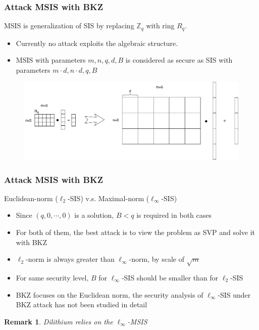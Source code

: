 \documentclass{beamer}
\newcommand{\bbZ}{\mathbb{Z}}
\newtheorem*{remark}{Remark}
\begin{document}
\frame
{
  \frametitle{Attack MSIS with BKZ}

  MSIS is generalization of SIS by replacing $\bbZ_q$ with ring $R_q$.
  \begin{itemize}
  	\item Currently no attack exploits the algebraic structure.
  	\item MSIS with parameters $m,n,q,d,B$ is considered as secure as SIS with parameters $m\cdot d,n\cdot d,q,B$
  \end{itemize}
  \begin{figure}[ht!]
  \includegraphics[width=\textwidth]{files/MSIS-SIS.pdf}
  \end{figure}
}

\frame
{
  \frametitle{Attack MSIS with BKZ}
  Euclidean-norm ($\ell_2$-SIS) v.s. Maximal-norm ($\ell_{\infty}$-SIS)
  \begin{itemize}
  	\item Since $(q,0,\cdots,0)$ is a solution, $B<q$ is required in both cases
  	\item For both of them, the best attack is to view the problem as SVP and solve it with BKZ
  	\item $\ell_2$-norm is always greater than $\ell_{\infty}$-norm, by scale of $\sqrt{m}$
  	\item For same security level, $B$ for $\ell_{\infty}$-SIS should be smaller than for $\ell_2$-SIS
  	\item BKZ focuses on the Euclidean norm, the security analysis of $\ell_{\infty}$-SIS under BKZ attack has not been studied in detail
  \end{itemize}

  \begin{remark}
  Dilithium relies on the $\ell_{\infty}$-MSIS
  \end{remark}
}
\end{document}
